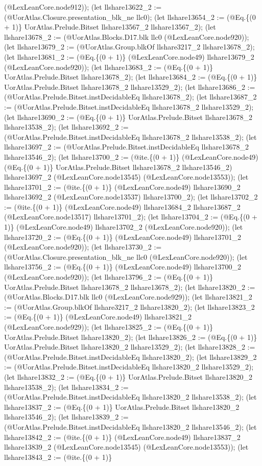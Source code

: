 \documentclass[11pt]{article}
\begin{document}
(@LexLeanCore.node912)); (let llshare13622\_2 := (@UorAtlas.Closure.presentation\_blk\_ne llc0); (let llshare13654\_2 := (@Eq.\{(0 + 1)\} UorAtlas.Prelude.Bitset llshare13567\_2 llshare13567\_2); (let llshare13678\_2 := (@UorAtlas.Blocks.D17.blk llc0 (@LexLeanCore.node920)); (let llshare13679\_2 := (@UorAtlas.Group.blkOf llshare3217\_2 llshare13678\_2); (let llshare13681\_2 := (@Eq.\{(0 + 1)\} (@LexLeanCore.node49) llshare13679\_2 (@LexLeanCore.node920)); (let llshare13683\_2 := (@Eq.\{(0 + 1)\} UorAtlas.Prelude.Bitset llshare13678\_2); (let llshare13684\_2 := (@Eq.\{(0 + 1)\} UorAtlas.Prelude.Bitset llshare13678\_2 llshare13529\_2); (let llshare13686\_2 := (@UorAtlas.Prelude.Bitset.instDecidableEq llshare13678\_2); (let llshare13687\_2 := (@UorAtlas.Prelude.Bitset.instDecidableEq llshare13678\_2 llshare13529\_2); (let llshare13690\_2 := (@Eq.\{(0 + 1)\} UorAtlas.Prelude.Bitset llshare13678\_2 llshare13538\_2); (let llshare13692\_2 := (@UorAtlas.Prelude.Bitset.instDecidableEq llshare13678\_2 llshare13538\_2); (let llshare13697\_2 := (@UorAtlas.Prelude.Bitset.instDecidableEq llshare13678\_2 llshare13546\_2); (let llshare13700\_2 := (@ite.\{(0 + 1)\} (@LexLeanCore.node49) (@Eq.\{(0 + 1)\} UorAtlas.Prelude.Bitset llshare13678\_2 llshare13546\_2) llshare13697\_2 (@LexLeanCore.node13545) (@LexLeanCore.node13553)); (let llshare13701\_2 := (@ite.\{(0 + 1)\} (@LexLeanCore.node49) llshare13690\_2 llshare13692\_2 (@LexLeanCore.node13537) llshare13700\_2); (let llshare13702\_2 := (@ite.\{(0 + 1)\} (@LexLeanCore.node49) llshare13684\_2 llshare13687\_2 (@LexLeanCore.node13517) llshare13701\_2); (let llshare13704\_2 := (@Eq.\{(0 + 1)\} (@LexLeanCore.node49) llshare13702\_2 (@LexLeanCore.node920)); (let llshare13720\_2 := (@Eq.\{(0 + 1)\} (@LexLeanCore.node49) llshare13701\_2 (@LexLeanCore.node920)); (let llshare13730\_2 := (@UorAtlas.Closure.presentation\_blk\_ne llc0 (@LexLeanCore.node920)); (let llshare13756\_2 := (@Eq.\{(0 + 1)\} (@LexLeanCore.node49) llshare13700\_2 (@LexLeanCore.node920)); (let llshare13796\_2 := (@Eq.\{(0 + 1)\} UorAtlas.Prelude.Bitset llshare13678\_2 llshare13678\_2); (let llshare13820\_2 := (@UorAtlas.Blocks.D17.blk llc0 (@LexLeanCore.node929)); (let llshare13821\_2 := (@UorAtlas.Group.blkOf llshare3217\_2 llshare13820\_2); (let llshare13823\_2 := (@Eq.\{(0 + 1)\} (@LexLeanCore.node49) llshare13821\_2 (@LexLeanCore.node929)); (let llshare13825\_2 := (@Eq.\{(0 + 1)\} UorAtlas.Prelude.Bitset llshare13820\_2); (let llshare13826\_2 := (@Eq.\{(0 + 1)\} UorAtlas.Prelude.Bitset llshare13820\_2 llshare13529\_2); (let llshare13828\_2 := (@UorAtlas.Prelude.Bitset.instDecidableEq llshare13820\_2); (let llshare13829\_2 := (@UorAtlas.Prelude.Bitset.instDecidableEq llshare13820\_2 llshare13529\_2); (let llshare13832\_2 := (@Eq.\{(0 + 1)\} UorAtlas.Prelude.Bitset llshare13820\_2 llshare13538\_2); (let llshare13834\_2 := (@UorAtlas.Prelude.Bitset.instDecidableEq llshare13820\_2 llshare13538\_2); (let llshare13837\_2 := (@Eq.\{(0 + 1)\} UorAtlas.Prelude.Bitset llshare13820\_2 llshare13546\_2); (let llshare13839\_2 := (@UorAtlas.Prelude.Bitset.instDecidableEq llshare13820\_2 llshare13546\_2); (let llshare13842\_2 := (@ite.\{(0 + 1)\} (@LexLeanCore.node49) llshare13837\_2 llshare13839\_2 (@LexLeanCore.node13545) (@LexLeanCore.node13553)); (let llshare13843\_2 := (@ite.\{(0 + 1)\} 
\end{document}
